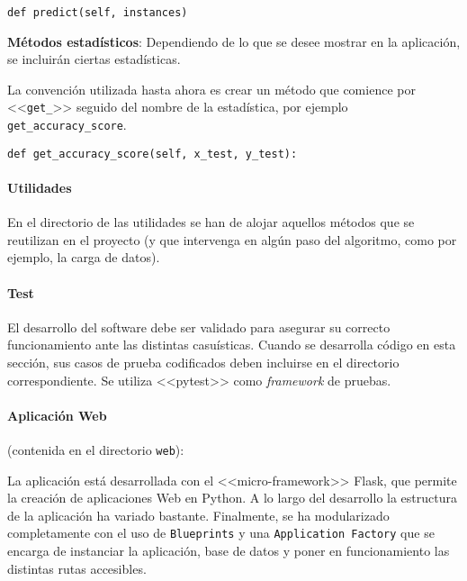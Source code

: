 \begin{tcolorbox}[colback=cyan!5!white,colframe=cyan!75!black,title=Cabecera predict]
\begin{verbatim}
def predict(self, instances)
\end{verbatim}
\end{tcolorbox}
    

\textbf{Métodos estadísticos}: Dependiendo de lo que se desee mostrar en la
aplicación, se incluirán ciertas estadísticas.

La convención utilizada hasta ahora es crear un método que comience por
<<\texttt{get\_}>> seguido del nombre de la estadística, por ejemplo
\texttt{get\_accuracy\_score}.

\begin{tcolorbox}[colback=cyan!5!white,colframe=cyan!75!black,title=Cabecera ejemplo estadística]
\begin{verbatim}
def get_accuracy_score(self, x_test, y_test):
\end{verbatim}
\end{tcolorbox}

\paragraph{Utilidades} En el directorio de las utilidades se han de alojar
aquellos métodos que se reutilizan en el proyecto (y que intervenga en algún paso
del algoritmo, como por ejemplo, la carga de datos). 

\paragraph{Test} El desarrollo del software debe ser validado para asegurar su
correcto funcionamiento ante las distintas casuísticas. Cuando se desarrolla
código en esta sección, sus casos de prueba codificados deben incluirse en el
directorio correspondiente. Se utiliza <<pytest>> como \textit{framework} de
pruebas.

\paragraph{Aplicación Web} (contenida en el directorio \texttt{web}):  

La aplicación está desarrollada con el <<micro-framework>> Flask, que permite la
creación de aplicaciones Web en Python. A lo largo del desarrollo la estructura
de la aplicación ha variado bastante. Finalmente, se ha modularizado
completamente con el uso de \texttt{Blueprints} y una \texttt{Application
Factory} que se encarga de instanciar la aplicación, base de datos y poner en
funcionamiento las distintas rutas accesibles.

